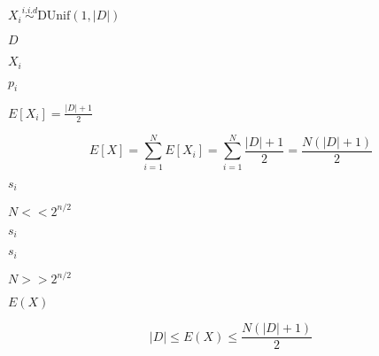 \documentclass[10pt]{book}
\begin{document}
\begin{mdSnippets}
\begin{mdInlineSnippet}
$X_i \stackrel{i.i.d}{\sim} \text{DUnif}(1,|D|)$\end{mdInlineSnippet}%
\begin{mdInlineSnippet}[f623e75af30e62bbd73d6df5b50bb7b5]%
$D$\end{mdInlineSnippet}%
\begin{mdInlineSnippet}[a97118fb9e8d7e006a466bfc0771f888]%
$X_i$\end{mdInlineSnippet}%
\begin{mdInlineSnippet}[eca91c83a74a2373ca5f796700e99fd3]%
$p_i$\end{mdInlineSnippet}%
\begin{mdInlineSnippet}[f5bd1f3fba2c9619351224775ea350e7]%
$E[X_i] = \frac{|D| + 1}{2}$\end{mdInlineSnippet}%
\begin{mdDisplaySnippet}%
\[%
E[X] = \sum_{i=1}^N E[X_i] = \sum_{i=1}^N \frac{|D| + 1}{2} = \frac{N(|D| + 1)}{2} 
\]%
\end{mdDisplaySnippet}%
\begin{mdInlineSnippet}[e406ac4d7c470823a8619c13dd7101be]%
$s_i$\end{mdInlineSnippet}%
\begin{mdInlineSnippet}[9f901a90526ab3321433f9bab1b0da9d]%
$N << 2^{n/2}$\end{mdInlineSnippet}%
\begin{mdInlineSnippet}[e406ac4d7c470823a8619c13dd7101be]%
$s_i$\end{mdInlineSnippet}%
\begin{mdInlineSnippet}[e406ac4d7c470823a8619c13dd7101be]%
$s_i$\end{mdInlineSnippet}%
\begin{mdInlineSnippet}[25e1a0e76df451244c5edd977ce39d96]%
$N >> 2^{n/2}$\end{mdInlineSnippet}%
\begin{mdInlineSnippet}[b44ed3606f9b2387a9f43341b2638551]%
$E(X)$\end{mdInlineSnippet}%
\begin{mdDisplaySnippet}%
\[%
|D| \leq E(X) \leq \frac{N(|D| + 1)}{2} 
\]%
\end{mdDisplaySnippet}%

\end{mdSnippets}
\end{document}
